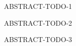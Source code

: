 %
%
%

\noindent       %
ABSTRACT-TODO-1

\vspace*{0.5em}
\noindent       %
ABSTRACT-TODO-2

\vspace*{0.5em}
\noindent       %
ABSTRACT-TODO-3
